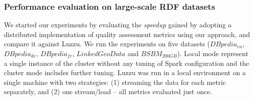 \subsubsection{Performance evaluation on large-scale RDF datasets}
\label{subsubsection:distqualityassessment-large_scale_datasets}

We started our experiments by evaluating the \textit{speedup} gained by adopting a distributed implementation of quality assessment metrics using our approach, and compare it against Luzzu.
We run the experiments on five datasets
($DBpedia_{en}$, $DBpedia_{de}$, $DBpedia_{fr}$, $LinkedGeoData$ and $BSBM_{200GB}$).
Local mode represent a single instance of the cluster without any tuning of Spark configuration and the cluster mode includes further tuning.
Luzzu was run in a local environment on a single machine with two strategies: (1) streaming the data for each metric separately, and (2) one stream/load -- all metrics evaluated just once. 

